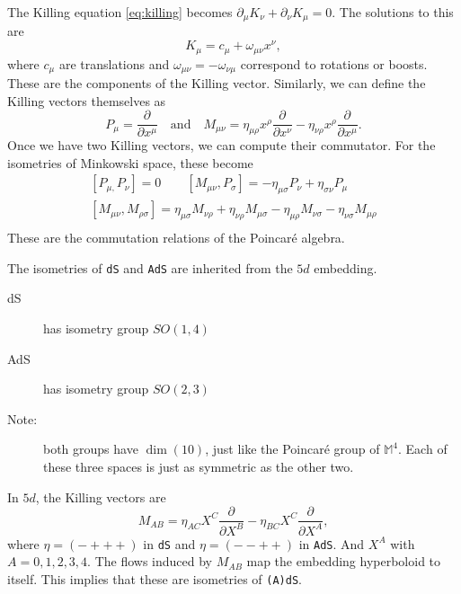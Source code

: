 \begin{example}
  The Killing equation \eqref{eq:killing} becomes $\partial_{\mu} K_{\nu} + \partial_{\nu} K_{\mu} = 0$. The solutions to this are
  \begin{equation}
    K_{\mu} = c_{\mu} + \omega_{\mu\nu} x^{\nu} ,
  \end{equation}
  where $c_{\mu}$ are translations and $\omega_{\mu\nu} = -\omega_{\nu\mu}$ correspond to rotations or boosts.
  These are the components of the Killing vector.
  Similarly, we can define the Killing vectors themselves as
  \begin{equation}
    P_{\mu} = \frac{\partial^{} }{\partial x^{\mu}} \quad \text{and} \quad M_{\mu\nu} = \eta_{\mu\rho} x^{\rho} \frac{\partial^{} }{\partial x^{\nu}} - \eta_{\nu\rho} x^{\rho} \frac{\partial^{} }{\partial x^{\mu}}.
  \end{equation}
  Once we have two Killing vectors, we can compute their commutator. For the isometries of Minkowski space, these become
  \begin{equation}
    \begin{gathered}
      [P_{\mu,} P_{\nu}] = 0 \qquad
      [M_{\mu\nu} , P_{\sigma}] = -\eta_{\mu\sigma} P_{\nu} + \eta _{\sigma\nu} P_{\mu} \\
      [M_{\mu\nu} , M_{\rho\sigma}] = \eta_{\mu\sigma} M_{\nu\rho} + \eta_{\nu\rho} M_{\mu\sigma} - \eta_{\mu\rho} M_{\nu\sigma} - \eta_{\nu\sigma} M_{\mu\rho} \\
    \end{gathered}
  \end{equation}
  These are the commutation relations of the Poincar\'e algebra.
\end{example}
\begin{example}[]
  The isometries of \texttt{dS} and \texttt{AdS} are inherited from the $5d$ embedding.
  \begin{description}
    \item[dS] has isometry group $SO(1, 4)$
    \item[AdS] has isometry group $SO(2, 3)$
    \item[Note:] both groups have $\dim(10)$, just like the Poincar\'e group of $\mathbb{M}^4$. Each of these three spaces is just as symmetric as the other two.
  \end{description}
  In $5d$, the Killing vectors are 
  \begin{equation}
    M_{AB} = \eta_{AC} X^{C} \frac{\partial^{} }{\partial X^{B}} - \eta_{BC} X^{C} \frac{\partial^{} }{\partial X^{A}},
  \end{equation}
  where $\eta = (- + + +)$ in \texttt{dS} and $\eta = (- - + + )$ in \texttt{AdS}. And $X^{A}$ with $A = 0,1,2,3,4$.
  The flows induced by $M_{AB}$ map the embedding hyperboloid to itself. This implies that these are isometries of \texttt{(A)dS}.
\end{example}
